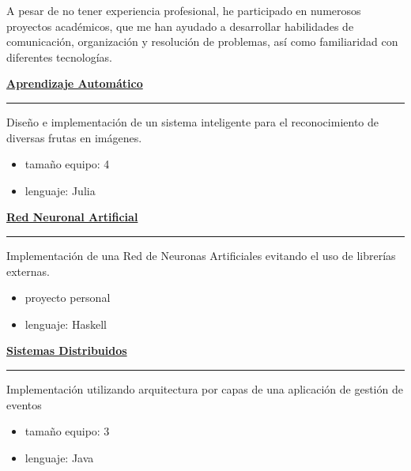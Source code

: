 \documentclass [10pt, a4paper] {extarticle}
\newcommand{\rightcolumwidth}{ 0.82 }
\begin{document}
    \begin {flushright}
    \begin {minipage} [t] {\rightcolumwidth\textwidth}
        A pesar de no tener experiencia profesional, he participado en numerosos proyectos académicos, que me han ayudado a desarrollar habilidades de comunicación, organización y resolución de problemas, así como familiaridad con diferentes tecnologías. \\ [7px]
        \begin {minipage} [t] {0.3\textwidth}
            \href {https://github.com/yref-boop/automatic-learning} {\textbf {Aprendizaje Automático}} \\ [-5px]
            \hrule
            \vspace {4px} Diseño e implementación de un sistema inteligente para el reconocimiento de diversas frutas en imágenes.
            \vspace {-5px}
            \begin {itemize} [noitemsep]
                \item tamaño equipo: 4
                \item lenguaje: Julia
            \end {itemize}
        \end {minipage}
        \hfill
        \begin {minipage} [t] {0.3\textwidth}
            \href {https://github.com/yref-boop/ann} {\textbf {Red Neuronal Artificial}} \\ [-5px]
            \hrule
            \vspace {4px} Implementación de una Red de Neuronas Artificiales evitando el uso de librerías externas.
            \vspace {-5px}
            \begin {itemize} [noitemsep]
                \item proyecto personal
                \item lenguaje: Haskell
            \end {itemize}
        \end {minipage}
        \hfill
        \begin {minipage} [t] {0.3\textwidth}
            \href {https://github.com/yref-boop/distributed-systems}{\textbf {Sistemas Distribuidos}} \\ [-5px]
            \hrule
            \vspace {4px} Implementación utilizando arquitectura por capas de una aplicación de gestión de eventos
            \vspace {-5px}
            \begin {itemize} [noitemsep]
                \item tamaño equipo: 3
                \item lenguaje: Java
            \end {itemize}
        \end {minipage}
    \end {minipage}
    \end {flushright}
\end{document}
